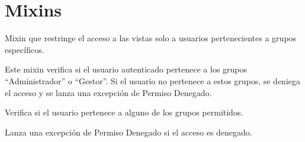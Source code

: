 \documentclass[letterpaper,10pt,spanish]{sphinxmanual}
\begin{document}
\section{Mixins}
\label{\detokenize{archivar:mixins}}

\begin{fulllineitems}

\pysigstartsignatures
{}
\pysigstopsignatures
\sphinxAtStartPar
Mixin que restringe el acceso a las vistas solo a usuarios pertenecientes
a grupos específicos.

\sphinxAtStartPar
Este mixin verifica si el usuario autenticado pertenece a los grupos
“Administrador” o “Gestor”. Si el usuario no pertenece a estos grupos,
se deniega el acceso y se lanza una excepción de Permiso Denegado.


\begin{fulllineitems}

\pysigstartsignatures
{}
\pysigstopsignatures
\sphinxAtStartPar
Verifica si el usuario pertenece a alguno de los grupos permitidos.

\end{fulllineitems}



\begin{fulllineitems}

\pysigstartsignatures
{}
\pysigstopsignatures
\sphinxAtStartPar
Lanza una excepción de Permiso Denegado si el acceso es denegado.

\end{fulllineitems}



\begin{fulllineitems}

\pysigstartsignatures
{}
\pysigstopsignatures
\end{fulllineitems}



\begin{fulllineitems}

\pysigstartsignatures
{}
\pysigstopsignatures
\end{fulllineitems}


\end{fulllineitems}
\end{document}
